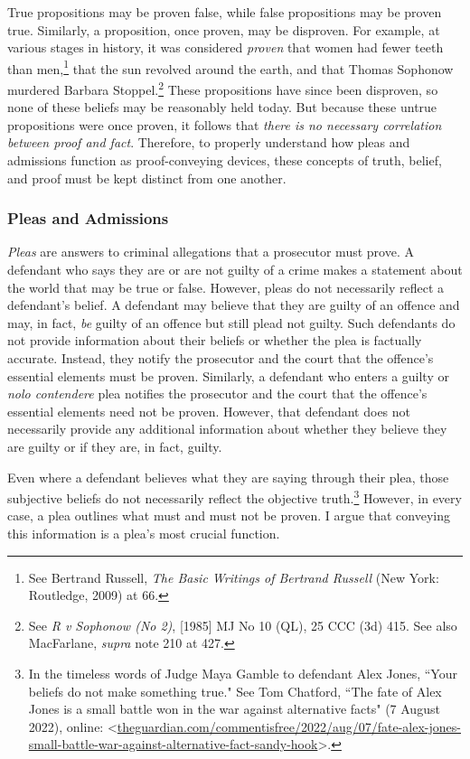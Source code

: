 True propositions may be proven false, while false propositions may be proven true. Similarly, a proposition, once proven, may be disproven. For example, at various stages in history, it was considered \textit{proven} that women had fewer teeth than men,\footnote{See Bertrand Russell, \textit{The Basic Writings of Bertrand Russell} (New York: Routledge, 2009) at 66.} that the sun revolved around the  earth, and that Thomas Sophonow murdered Barbara Stoppel.\footnote{See \textit{R v Sophonow (No 2)}, [1985] MJ No 10 (QL), 25 CCC (3d) 415. See also MacFarlane, \textit{supra} note 210 at 427.} These propositions have since been disproven, so none of these beliefs may be reasonably held today. But because these untrue propositions were once proven, it follows that \textit{there is no necessary correlation between proof and fact}. Therefore, to properly understand how pleas and admissions function as proof-conveying devices, these concepts of truth, belief, and proof must be kept distinct from one another.

\subsubsection{Pleas and Admissions}

\textit{Pleas} are answers to criminal allegations that a prosecutor must prove. A defendant who says they are or are not guilty of a crime makes a statement about the world that may be true or false. However, pleas do not necessarily reflect a defendant's belief. A defendant may believe that they are guilty of an offence and may, in fact, \textit{be} guilty of an offence but still plead not guilty. Such defendants do not provide information about their beliefs or whether the plea is factually accurate. Instead, they notify the prosecutor and the court that the offence's essential elements must be proven. Similarly, a defendant who enters a guilty or \textit{nolo contendere} plea notifies the prosecutor and the court that the offence's essential elements need not be proven. However, that defendant does not necessarily provide any additional information about whether they believe they are guilty or if they are, in fact, guilty.

Even where a defendant believes what they are saying through their plea, those subjective beliefs do not necessarily reflect the objective truth.\footnote{In the timeless words of Judge Maya Gamble to defendant Alex Jones, ``Your beliefs do not make something true." See Tom Chatford, ``The fate of Alex Jones is a small battle won in the war against alternative facts" (7 August 2022), online: \textless \url{theguardian.com/commentisfree/2022/aug/07/fate-alex-jones-small-battle-war-against-alternative-fact-sandy-hook}\textgreater.} However, in every case, a plea outlines what must and must not be proven. I argue that conveying this information is a plea's most crucial function.

